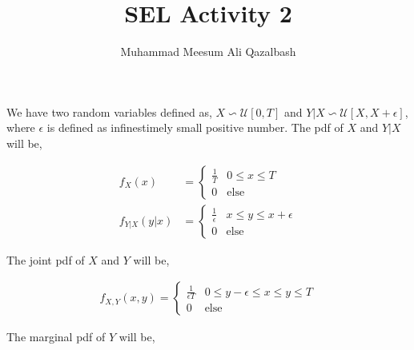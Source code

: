 \documentclass{article}
\title{SEL Activity 2}
\author{Muhammad Meesum Ali Qazalbash}
\theoremstyle{mytheoremstyle}
\theoremstyle{mytheoremstyle}
\theoremstyle{myproblemstyle}
\begin{document}
\maketitle

We have two random variables defined as, \(X\backsim\mathcal{U}[0,T]\) and \(Y|X\backsim \mathcal{U}[X,X+\epsilon]\), where \(\epsilon\) is defined as infinestimely small positive number. The pdf of \(X\) and \(Y|X\) will be,

\begin{equation*}
    \begin{split}
        f_X(x)&=\begin{cases}
            \displaystyle\frac{1}{T} & 0\le x\le T \\
            0                        & \text{else}
        \end{cases}\\
        f_{Y|X}(y|x)&=\begin{cases}
            \displaystyle\frac{1}{\epsilon} & x\le y\le x+\epsilon \\
            0                               & \text{else}
        \end{cases}
    \end{split}
\end{equation*}

The joint pdf of \(X\) and \(Y\) will be,

\begin{equation*}
    \begin{split}
        f_{X,Y}(x,y)=\begin{cases}
            \displaystyle\frac{1}{\epsilon T} & 0\le y-\epsilon\le x\le y\le T \\
            0                                 & \text{else}
        \end{cases}
    \end{split}
\end{equation*}

The marginal pdf of \(Y\) will be,
\end{document}
